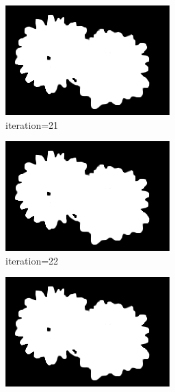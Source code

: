 \documentclass{article}
\begin{document}
\begin{figure}[t]
\begin{subfigure}[t]{0.19\textwidth}
\includegraphics[width=\textwidth]{./images/marginals_iter_21.png}
\vspace{-0.6cm}
\caption{iteration=21}
\end{subfigure}
\begin{subfigure}[t]{0.19\textwidth}
\centering
\includegraphics[width=\textwidth]{./images/marginals_iter_22.png}
\vspace{-0.6cm}
\caption{iteration=22}
\end{subfigure}
\begin{subfigure}[t]{0.19\textwidth}
\centering
\includegraphics[width=\textwidth]{./images/marginals_iter_23.png}

\end{subfigure}
\end{figure}
\end{document}
